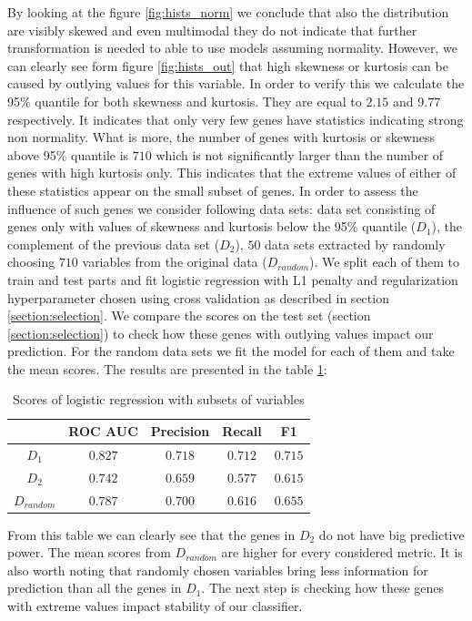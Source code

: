 \documentclass[12pt, wide]{mwart}
\begin{document}
By looking at the figure \ref{fig:hists_norm} we conclude that also the distribution are visibly skewed and even multimodal they do not indicate that further transformation is needed to able to use models assuming normality. However, we can clearly see form figure \ref{fig:hists_out} that high skewness or kurtosis can be caused by outlying values for this variable. In order to verify this we calculate the 95\% quantile for both skewness and kurtosis. They are equal to $2.15$ and $9.77$ respectively. It indicates that only very few genes have statistics indicating strong non normality. What is more, the number of genes with kurtosis or skewness above 95\% quantile is $710$ which is not significantly larger than the number of genes with high kurtosis only. This indicates that the extreme values of either of these statistics appear on the small subset of genes. In order to assess the influence of such genes we consider following data sets: data set consisting of genes only with values of skewness and kurtosis below the 95\% quantile ($D_1$), the complement of the previous data set ($D_2$), $50$ data sets extracted by randomly choosing $710$ variables from the original data ($D_{random}$). We split each of them to train and test parts and fit logistic regression with L1 penalty and regularization hyperparameter chosen using cross validation as described in section \ref{section:selection}. We compare the scores on the test set (section \ref{section:selection}) to check how these genes with outlying values impact our prediction. For the random data sets we fit the model for each of them and take the mean scores. The results are presented in the table \ref{tab:scores-trunc}: 
\begin{table}[H]
\centering
    \begin{tabular}[t]{c c c c c}
    \toprule
    & ROC AUC & Precision & Recall & F1\\
    \midrule
    $D_1$ & $0.827$ & $0.718$ &	$0.712$ & $0.715$ \\
    $D_2$ & $0.742$ & $0.659$ & $0.577$ & $0.615$ \\
    $D_{random}$ & $0.787$ & $0.700$ & $0.616$ & $0.655$ \\
    \bottomrule
\end{tabular}
    \caption{Scores of logistic regression with subsets of variables}
    \label{tab:scores-trunc}
\end{table}

From this table we can clearly see that the genes in $D_2$ do not have big predictive power. The mean scores from $D_{random}$ are higher for every considered metric. It is also worth noting that randomly chosen variables bring less information for prediction than all the genes in $D_1$. The next step is checking how these genes with extreme values impact stability of our classifier.
\end{document}
